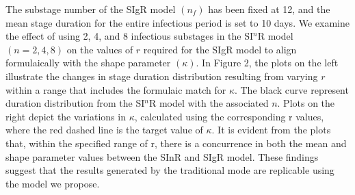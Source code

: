 \documentclass[12pt]{article}
\begin{document}
The substage number of the SIgR model $(n_f)$ has been fixed at 12, and the mean stage duration for the entire infectious period is set to 10 days. We examine the effect of using 2, 4, and 8 infectious substages in the SI$^n$R model $(n = 2, 4, 8)$ on the values of $r$ required for the SIgR model to align formulaically with the shape parameter $(\kappa)$. In Figure 2, the plots on the left illustrate the changes in stage duration distribution resulting from varying $r$ within a range that includes the formulaic match for $\kappa$. The black curve represent duration distribution from the SI$^n$R model with the associated $n$. Plots on the right depict the variations in $\kappa$, calculated using the corresponding r values, where the red dashed line is the target value of $\kappa$. It is evident from the plots that, within the specified range of r, there is a concurrence in both the mean and shape parameter values between the SInR and SIgR model. These findings suggest that the results generated by the traditional mode are replicable using the model we propose.
\end{document}
